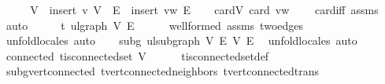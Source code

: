 \begin{isabellebody}
%
\isadelimproof
%
\endisadelimproof
%
\isatagproof
{}\isamarkupfalse%
\ {\isacharminus}{\kern0pt}\isanewline
\ \ \isamarkupfalse%
\ {\isacharquery}{\kern0pt}V{\isacharprime}{\kern0pt}\ {\isacharequal}{\kern0pt}\ {\isachardoublequoteopen}insert\ v\ V{\isachardoublequoteclose}\ \ {\isacharquery}{\kern0pt}E{\isacharprime}{\kern0pt}\ {\isacharequal}{\kern0pt}\ {\isachardoublequoteopen}insert\ {\isacharbraceleft}{\kern0pt}v{\isacharcomma}{\kern0pt}w{\isacharbraceright}{\kern0pt}\ E{\isachardoublequoteclose}\isanewline
\isanewline
\ \ \isamarkupfalse%
\ cardV{\isacharcolon}{\kern0pt}\ {\isachardoublequoteopen}card\ {\isacharbraceleft}{\kern0pt}v{\isacharcomma}{\kern0pt}w{\isacharbraceright}{\kern0pt}\ {\isacharequal}{\kern0pt}\ {}{\isachardoublequoteclose}\ \isamarkupfalse%
\ card{\isacharunderscore}{\kern0pt}{}{\isacharunderscore}{\kern0pt}iff\ assms\ \isamarkupfalse%
\ auto\isanewline
\ \ \isamarkupfalse%
\ \isamarkupfalse%
\ t{\isacharprime}{\kern0pt}{\isacharcolon}{\kern0pt}\ ulgraph\ {\isacharquery}{\kern0pt}V{\isacharprime}{\kern0pt}\ {\isacharquery}{\kern0pt}E{\isacharprime}{\kern0pt}\isanewline
\ \ \ \ \isamarkupfalse%
\ wellformed\ assms\ two{\isacharunderscore}{\kern0pt}edges\ \isamarkupfalse%
\ {\isacharparenleft}{\kern0pt}unfold{\isacharunderscore}{\kern0pt}locales{\isacharcomma}{\kern0pt}\ auto{\isacharparenright}{\kern0pt}\isanewline
\isanewline
\ \ \isamarkupfalse%
\ subg{\isacharcolon}{\kern0pt}\ ulsubgraph\ V\ E\ {\isacharquery}{\kern0pt}V{\isacharprime}{\kern0pt}\ {\isacharquery}{\kern0pt}E{\isacharprime}{\kern0pt}\ \isamarkupfalse%
\ {\isacharparenleft}{\kern0pt}unfold{\isacharunderscore}{\kern0pt}locales{\isacharcomma}{\kern0pt}\ auto{\isacharparenright}{\kern0pt}\isanewline
\isanewline
\ \ \isamarkupfalse%
\ connected{\isacharcolon}{\kern0pt}\ {\isachardoublequoteopen}t{\isacharprime}{\kern0pt}{\isachardot}{\kern0pt}is{\isacharunderscore}{\kern0pt}connected{\isacharunderscore}{\kern0pt}set\ {\isacharquery}{\kern0pt}V{\isacharprime}{\kern0pt}{\isachardoublequoteclose}\isanewline
\ \ \ \ \isamarkupfalse%
\ t{\isacharprime}{\kern0pt}{\isachardot}{\kern0pt}is{\isacharunderscore}{\kern0pt}connected{\isacharunderscore}{\kern0pt}set{\isacharunderscore}{\kern0pt}def\isanewline
\ \ \ \ \isamarkupfalse%
\ subg{\isachardot}{\kern0pt}vert{\isacharunderscore}{\kern0pt}connected\ t{\isacharprime}{\kern0pt}{\isachardot}{\kern0pt}vert{\isacharunderscore}{\kern0pt}connected{\isacharunderscore}{\kern0pt}neighbors\ t{\isacharprime}{\kern0pt}{\isachardot}{\kern0pt}vert{\isacharunderscore}{\kern0pt}connected{\isacharunderscore}{\kern0pt}trans\isanewline

\end{isabellebody}
